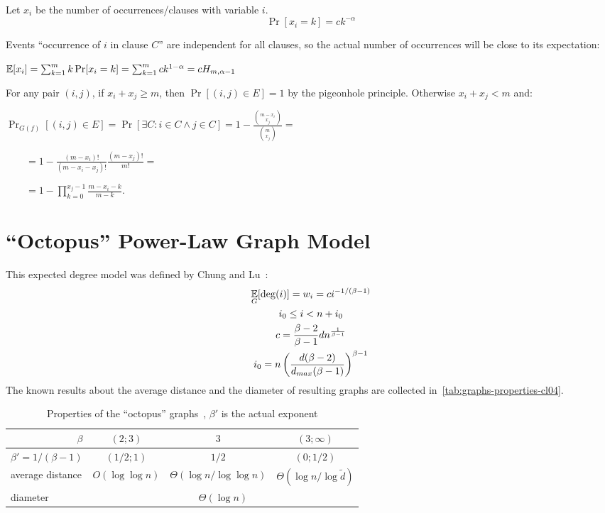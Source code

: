 Let $x_i$ be the number of occurrences/clauses with variable $i$.
\begin{equation}
    \Pr[x_i=k]=ck^{-\alpha}
\end{equation}

Events ``occurrence of $i$ in clause $C$'' are independent for all clauses,
so the actual number of occurrences will be close to its expectation:

$\mathop{{}\mathbb{E}}[x_i]=\sum_{k=1}^m{k\Pr[x_i=k]}=\sum_{k=1}^m{ck^{1-\alpha}}=cH_{m,\alpha-1}$

For any pair $(i,j)$, if $x_i+x_j\geq m$, then $\Pr[(i,j)\in E]=1$ by the pigeonhole principle.
Otherwise $x_i+x_j<m$ and:

$\Pr_{G(f)}[(i,j)\in E]=\Pr[\exists C:i\in C\land j\in C]
=1-\frac{\binom{m-x_i}{x_j}}{\binom{m}{x_j}}=$

$\qquad=1-\frac{(m-x_i)!}{(m-x_i-x_j)!}\frac{(m-x_j)!}{m!}=$

$\qquad=1-\prod_{k=0}^{x_j-1}{\frac{m-x_i-k}{m-k}}$.

\section{\texorpdfstring{``Octopus''}{"Octopus"} Power-Law Graph Model}
\label{sec:powerlaw-octopus-model}

This expected degree model was defined by Chung and Lu~\cite{cl04}:
\begin{gather}
    \mathop{{}\mathbb{E}}_G[\deg(i)]=w_i=ci^{-1/(\beta-1)}\\
    i_0\leq i<n+i_0\\
    c=\frac{\beta-2}{\beta-1}dn^{\frac{1}{\beta-1}}\\
    i_0=n\left(\frac{d(\beta-2)}{d_{max}(\beta-1)}\right)^{\beta-1}
\end{gather}
The known results about the average distance and the diameter of resulting graphs
are collected in~\autoref{tab:graphs-properties-cl04}.

\begin{table}
    \begin{center}
        \caption[Properties of the ``octopus'' graphs~\cite{cl04}]
                {Properties of the ``octopus'' graphs~\cite{cl04}, $\beta'$ is the actual exponent}
        \label{tab:graphs-properties-cl04}
        \renewcommand*{\arraystretch}{1.3}
        \begin{tabular}{|l|c|c|c|}
            \hline
            \multicolumn{1}{|r|}{$\beta$} & $(2;3)$ & $3$ & $(3;\infty)$\\
            \hline
            \multicolumn{1}{|r|}{$\beta'=1/(\beta-1)$} & $(1/2;1)$ & $1/2$ & $(0;1/2)$\\
            \hline\hline
            average distance & $O(\log\log n)$ & $\Theta(\log n/\log\log n)$ & $\Theta(\log n/\log \tilde{d})$\\
            \hline
            diameter & \multicolumn{3}{|c|}{$\Theta(\log n)$}\\
            \hline
        \end{tabular}
    \end{center}
\end{table}

